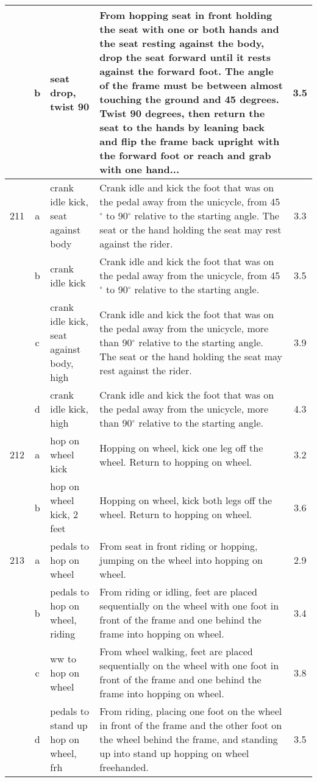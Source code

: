 \begin{longtable}{|r|c|p{4cm}|p{8cm}|c|}
\hline
  & b & seat drop, twist 90 & From hopping seat in front holding the seat with one or both hands and the seat resting against the body, drop the seat forward until it rests against the forward foot. The angle of the frame must be between almost touching the ground and 45 degrees. Twist 90 degrees, then return the seat to the hands by leaning back and flip the frame back upright with the forward foot or reach and grab with one hand... & 3.5 \\ 
\hline
211 & a & crank idle kick, seat against body  & Crank idle and kick the foot that was on the pedal away from the unicycle, from 45$^\circ$ to 90$^\circ$ relative to the starting angle. The seat or the hand holding the seat may rest against the rider.  & 3.3 \\ 
\hline
  & b & crank idle kick & Crank idle and kick the foot that was on the pedal away from the unicycle, from 45$^\circ$ to 90$^\circ$ relative to the starting angle.  & 3.5 \\ 
\hline
  & c & crank idle kick, seat against body, high  & Crank idle and kick the foot that was on the pedal away from the unicycle, more than 90$^\circ$ relative to the starting angle. The seat or the hand holding the seat may rest against the rider.  & 3.9 \\ 
\hline
  & d & crank idle kick, high & Crank idle and kick the foot that was on the pedal away from the unicycle, more than 90$^\circ$ relative to the starting angle.  & 4.3 \\ 
\hline
212 & a & hop on wheel kick & Hopping on wheel, kick one leg off the wheel. Return to hopping on wheel. & 3.2 \\ 
\hline
  & b & hop on wheel kick, 2 feet & Hopping on wheel, kick both legs off the wheel. Return to hopping on wheel. & 3.6 \\ 
\hline
213 & a & pedals to hop on wheel  & From seat in front riding or hopping, jumping on the wheel into hopping on wheel. & 2.9 \\ 
\hline
  & b & pedals to hop on wheel, riding  & From riding or idling, feet are placed sequentially on the wheel with one foot in front of the frame and one behind the frame into hopping on wheel.  & 3.4 \\ 
\hline
  & c & ww to hop on wheel  & From wheel walking, feet are placed sequentially on the wheel with one foot in front of the frame and one behind the frame into hopping on wheel. & 3.8 \\ 
\hline
  & d & pedals to stand up hop on wheel, frh  & From riding, placing one foot on the wheel in front of the frame and the other foot on the wheel behind the frame, and standing up into stand up hopping on wheel freehanded. & 3.5 \\ 

\end{longtable}
